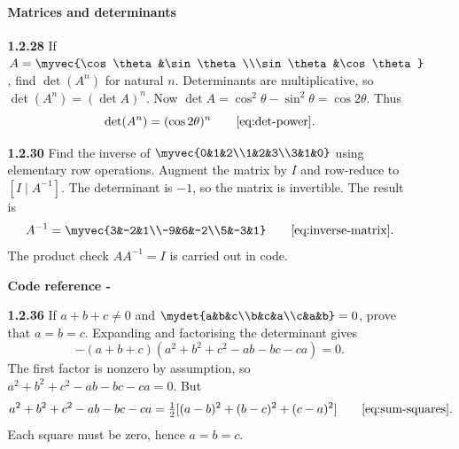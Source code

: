 \begin{enumerate}[label={},leftmargin=0pt]
\begin{enumerate}[label={},leftmargin=4mm,itemsep=9pt]
\paragraph*{Matrices and determinants}
\setcounter{enumii}{28}
\setcounter{equation}{0}
\item[\textbf{1.2.28}] If $A=\myvec{\cos\theta&\sin\theta\\\sin\theta&\cos\theta}$, find $\det(A^n)$ for natural $n$.
\solution Determinants are multiplicative, so $\det(A^n)=(\det A)^n$. Now $\det A=\cos^2\theta-\sin^2\theta=\cos2\theta$. Thus
\[
\det(A^n)=(\cos2\theta)^n\qquad\eqref{eq:det-power}.
\]

\setcounter{enumii}{30}
\setcounter{equation}{0}
\item[\textbf{1.2.30}] Find the inverse of $\myvec{0&1&2\\1&2&3\\3&1&0}$ using elementary row operations.
\solution Augment the matrix by $I$ and row-reduce to $[I\mid A^{-1}]$. The determinant is $-1$, so the matrix is invertible. The result is
\[
A^{-1}=\myvec{3&-2&1\\-9&6&-2\\5&-3&1}\qquad\eqref{eq:inverse-matrix}.
\]
The product check $AA^{-1}=I$ is carried out in code.
\par\smallskip
\noindent\textbf{Code reference -}
\par\noindent{}
\par\smallskip

\setcounter{enumii}{36}
\setcounter{equation}{0}
\item[\textbf{1.2.36}] If $a+b+c\ne0$ and $\mydet{a&b&c\\b&c&a\\c&a&b}=0$, prove that $a=b=c$.
\solution Expanding and factorising the determinant gives
\[
-(a+b+c)(a^2+b^2+c^2-ab-bc-ca)=0.
\]
The first factor is nonzero by assumption, so $a^2+b^2+c^2-ab-bc-ca=0$. But
\[
a^2+b^2+c^2-ab-bc-ca=\tfrac12[(a-b)^2+(b-c)^2+(c-a)^2]\qquad\eqref{eq:sum-squares}.
\]
Each square must be zero, hence $a=b=c$.


\end{enumerate}
\end{enumerate}
